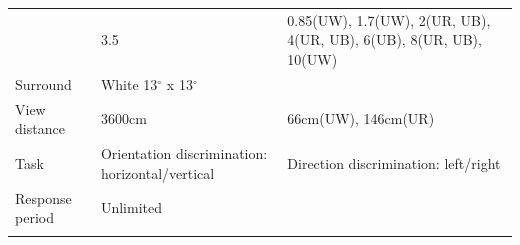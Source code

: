 \documentclass[]{article}
\begin{document}
\begin{longtable}[]{@{}lll@{}}
\begin{minipage}[t]{0.36\columnwidth}
\end{minipage} & \begin{minipage}[t]{0.29\columnwidth}\raggedright
3.5\strut
\end{minipage} & \begin{minipage}[t]{0.26\columnwidth}\raggedright
0.85(UW), 1.7(UW), 2(UR, UB), 4(UR, UB), 6(UB), 8(UR, UB), 10(UW)\strut
\end{minipage}\tabularnewline
\begin{minipage}[t]{0.36\columnwidth}\raggedright
Surround\strut
\end{minipage} & \begin{minipage}[t]{0.29\columnwidth}\raggedright
White 13\(^{\circ}\) x 13\(^{\circ}\)\strut
\end{minipage} & \begin{minipage}[t]{0.26\columnwidth}\raggedright
\strut
\end{minipage}\tabularnewline
\begin{minipage}[t]{0.36\columnwidth}\raggedright
View distance\strut
\end{minipage} & \begin{minipage}[t]{0.29\columnwidth}\raggedright
3600cm\strut
\end{minipage} & \begin{minipage}[t]{0.26\columnwidth}\raggedright
66cm(UW), 146cm(UR)\strut
\end{minipage}\tabularnewline
\begin{minipage}[t]{0.36\columnwidth}\raggedright
Task\strut
\end{minipage} & \begin{minipage}[t]{0.29\columnwidth}\raggedright
Orientation discrimination: horizontal/vertical\strut
\end{minipage} & \begin{minipage}[t]{0.26\columnwidth}\raggedright
Direction discrimination: left/right\strut
\end{minipage}\tabularnewline
\begin{minipage}[t]{0.36\columnwidth}\raggedright
Response period\strut
\end{minipage} & \begin{minipage}[t]{0.29\columnwidth}\raggedright
Unlimited\strut
\end{minipage} & \begin{minipage}[t]{0.26\columnwidth}\raggedright
\strut
\end{minipage}\tabularnewline
\begin{minipage}[t]{0.36\columnwidth}\raggedright

\end{minipage}
\end{longtable}
\end{document}

